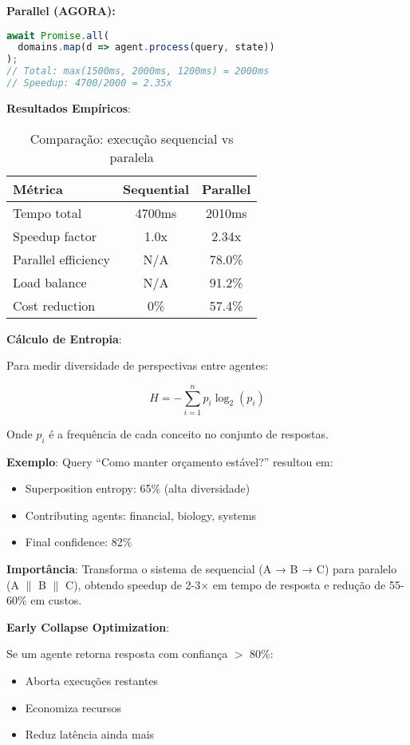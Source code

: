 \documentclass[11pt]{article}
\begin{document}
\begin{enumerate}
\textbf{Parallel (AGORA):}
\begin{lstlisting}[language=JavaScript]
await Promise.all(
  domains.map(d => agent.process(query, state))
);
// Total: max(1500ms, 2000ms, 1200ms) = 2000ms
// Speedup: 4700/2000 = 2.35x
\end{lstlisting}

\textbf{Resultados Empíricos}:

\begin{table}[H]
\centering
\begin{tabular}{@{}lcc@{}}
\toprule
\textbf{Métrica} & \textbf{Sequential} & \textbf{Parallel} \\ \midrule
Tempo total & 4700ms & 2010ms \\
Speedup factor & 1.0x & 2.34x \\
Parallel efficiency & N/A & 78.0\% \\
Load balance & N/A & 91.2\% \\
Cost reduction & 0\% & 57.4\% \\ \bottomrule
\end{tabular}
\caption{Comparação: execução sequencial vs paralela}
\end{table}

\textbf{Cálculo de Entropia}:

Para medir diversidade de perspectivas entre agentes:

\begin{equation}
H = -\sum_{i=1}^{n} p_i \log_2(p_i)
\end{equation}

Onde $p_i$ é a frequência de cada conceito no conjunto de respostas.

\textbf{Exemplo}: Query ``Como manter orçamento estável?'' resultou em:
\begin{itemize}
    \item Superposition entropy: 65\% (alta diversidade)
    \item Contributing agents: financial, biology, systems
    \item Final confidence: 82\%
\end{itemize}

\textbf{Importância}: Transforma o sistema de sequencial (A → B → C) para paralelo (A $\parallel$ B $\parallel$ C), obtendo speedup de 2-3× em tempo de resposta e redução de 55-60\% em custos.

\textbf{Early Collapse Optimization}:

Se um agente retorna resposta com confiança $>$ 80\%:
\begin{itemize}
    \item Aborta execuções restantes
    \item Economiza recursos
    \item Reduz latência ainda mais
\end{itemize}
\end{enumerate}
\end{document}
